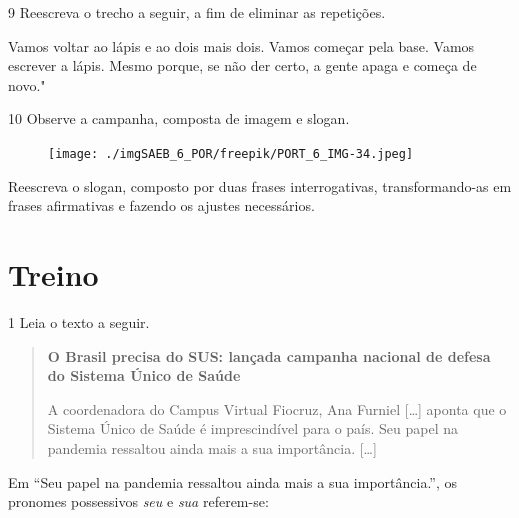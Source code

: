 \num{9} Reescreva o trecho a seguir, a fim de eliminar as repetições.

Vamos voltar ao lápis e ao dois mais dois. Vamos começar pela base.
Vamos escrever a lápis. Mesmo porque, se não der certo, a gente apaga e
começa de novo."


\num{10} Observe a campanha, composta de imagem e slogan.

\begin{figure}[H]
\centering\texttt{[image: ./imgSAEB\_6\_POR/freepik/PORT\_6\_IMG-34.jpeg]}
\end{figure}

\begin{quote}
\end{quote}

\noindent Reescreva o slogan, composto por duas frases interrogativas,
transformando-as em frases afirmativas e fazendo os ajustes necessários.


\section*{Treino}

\num{1} Leia o texto a seguir.

\begin{quote}
\textbf{O Brasil precisa do SUS: lançada campanha nacional de defesa do
Sistema Único de Saúde}\\
\medskip

\noindent A coordenadora do Campus Virtual Fiocruz, Ana Furniel {[}\ldots{]}
aponta que o Sistema Único de Saúde é imprescindível para o país. Seu
papel na pandemia ressaltou ainda mais a sua importância. {[}\ldots{]}

\end{quote}

\noindent Em ``Seu papel na pandemia ressaltou ainda mais a sua importância.'', os
pronomes possessivos \emph{seu} e \emph{sua} referem-se:

